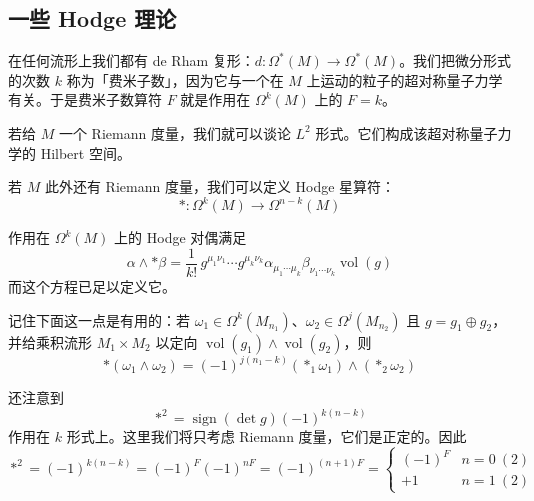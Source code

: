 \subsection{一些 Hodge 理论} %

在任何流形上我们都有 de Rham 复形：$d:\Omega^*(M)\to\Omega^*(M)$。我们把微分形式的次数 $k$ 称为「费米子数」，因为它与一个在 $M$ 上运动的粒子的超对称量子力学有关。于是费米子数算符 $F$ 就是作用在 $\Omega^k(M)$ 上的 $F = k$。

若给 $M$ 一个 Riemann 度量，我们就可以谈论 $L^2$ 形式。它们构成该超对称量子力学的 Hilbert 空间。

若 $M$ 此外还有 Riemann 度量，我们可以定义 Hodge 星算符：
\begin{equation}
  *:\Omega^k(M)\to\Omega^{n-k}(M)
  \tag{F.1}
  \label{eq:F.1}
\end{equation}

作用在 $\Omega^k(M)$ 上的 Hodge 对偶满足
\begin{equation}
  \alpha\wedge*\beta
  = \frac{1}{k!}\,g^{\mu_1\nu_1}\cdots g^{\mu_k\nu_k}
    \alpha_{\mu_1\cdots\mu_k}\beta_{\nu_1\cdots\nu_k}\operatorname{vol}(g)
  \tag{F.2}
  \label{eq:F.2}
\end{equation}
而这个方程已足以定义它。

记住下面这一点是有用的：若 $\omega_1\in\Omega^k(M_{n_1})$、$\omega_2\in\Omega^j(M_{n_2})$ 且
$g = g_1\oplus g_2$，并给乘积流形 $M_1\times M_2$ 以定向
$\operatorname{vol}(g_1)\wedge\operatorname{vol}(g_2)$，则
\begin{equation}
  *(\omega_1\wedge\omega_2)
  = (-1)^{j(n_1-k)}(*_1\omega_1)\wedge(*_2\omega_2)
  \tag{F.3}
  \label{eq:F.3}
\end{equation}

还注意到
\begin{equation}
  *^2 = \operatorname{sign}(\det g)(-1)^{k(n-k)}
  \tag{F.4}
  \label{eq:F.4}
\end{equation}
作用在 $k$ 形式上。这里我们将只考虑 Riemann 度量，它们是正定的。因此
\begin{equation}
  *^2 = (-1)^{k(n-k)} = (-1)^F(-1)^{nF} = (-1)^{(n+1)F}
  = \begin{cases}
      (-1)^F & n = 0\ (2)\\
      +1 & n = 1\ (2)
    \end{cases}
  \tag{F.5}
  \label{eq:F.5}
\end{equation}


